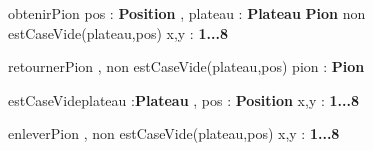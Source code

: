 \vspace*{5mm}

\begin{algorithme}
  \small
  \fonctionAvecPreconditions
      {obtenirPion}
      {pos : \textbf{Position} , plateau : \textbf{Plateau}}
      {\textbf{Pion}}
      {non estCaseVide(plateau,pos)}
      {x,y : \textbf{1...8}}
      {
      }
\end{algorithme}

\vspace*{5mm}

\begin{algorithme}
  \small
  \procedureAvecPreconditions
      {retournerPion}
      { , }
      {non estCaseVide(plateau,pos)}
      {pion : \textbf{Pion}}
      {
      }
\end{algorithme}

\vspace*{5mm}

\begin{algorithme}
  \small
  \fonction
      {estCaseVide}{plateau :\textbf{Plateau} , pos : \textbf{Position}}
      {\booleen}
      {x,y : \textbf{1...8}}
      {
      }
\end{algorithme}

\vspace*{5mm}

\begin{algorithme}
  \small
  \procedureAvecPreconditions
      {enleverPion}
      { , }
      {non estCaseVide(plateau,pos)}
      {x,y : \textbf{1...8}}
      {
      }
      
      
\end{algorithme}

